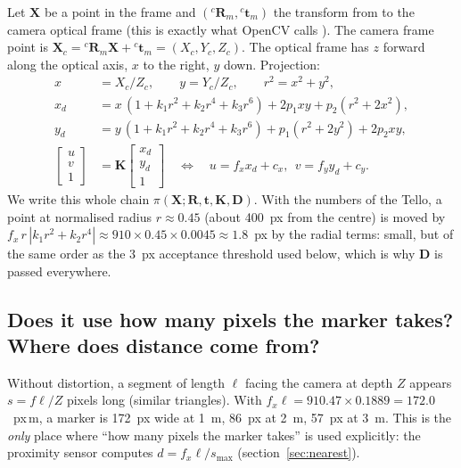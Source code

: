 Let $\mathbf X$ be a point in the  frame and $({}^c\mathbf R_m, {}^c\mathbf t_m)$ the transform from
 to the camera optical frame (this is exactly what OpenCV calls ). The camera frame point
is $\mathbf X_c = {}^c\mathbf R_m \mathbf X + {}^c\mathbf t_m = (X_c,Y_c,Z_c)$. The optical frame has $z$ forward
along the optical axis, $x$ to the right, $y$ down. Projection:
\begin{align}
x &= X_c/Z_c,\qquad y = Y_c/Z_c, \qquad r^2 = x^2+y^2,\\
x_d &= x\,(1+k_1r^2+k_2r^4+k_3r^6) + 2p_1xy + p_2(r^2+2x^2),\\
y_d &= y\,(1+k_1r^2+k_2r^4+k_3r^6) + p_1(r^2+2y^2) + 2p_2xy,\\
\begin{bmatrix}u\\v\\1\end{bmatrix} &= \mathbf K\begin{bmatrix}x_d\\y_d\\1\end{bmatrix}
\quad\Longleftrightarrow\quad u = f_x x_d + c_x,\ \ v = f_y y_d + c_y .
\end{align}
We write this whole chain $\pi(\mathbf X; \mathbf R,\mathbf t,\mathbf K,\mathbf D)$. With the numbers of the
Tello, a point at normalised radius $r\approx 0.45$ (about 400~px from the centre) is moved by
$f_x\, r\, |k_1r^2+k_2r^4| \approx 910\times 0.45\times 0.0045 \approx 1.8$~px by the radial terms: small, but of the
same order as the 3~px acceptance threshold used below, which is why $\mathbf D$ is passed everywhere.

\subsection{Does it use how many pixels the marker takes? Where does distance come from?}

Without distortion, a segment of length $\ell$ facing the camera at depth $Z$ appears $s = f\ell/Z$ pixels long
(similar triangles). With $f_x\ell = 910.47\times 0.1889 = 172.0$~px\,m, a marker is 172~px wide at 1~m, 86~px at 2~m,
57~px at 3~m. This is the \emph{only} place where ``how many pixels the marker takes'' is used explicitly: the
proximity sensor  computes $d = f_x\ell/s_{\max}$ (section~\ref{sec:nearest}).

